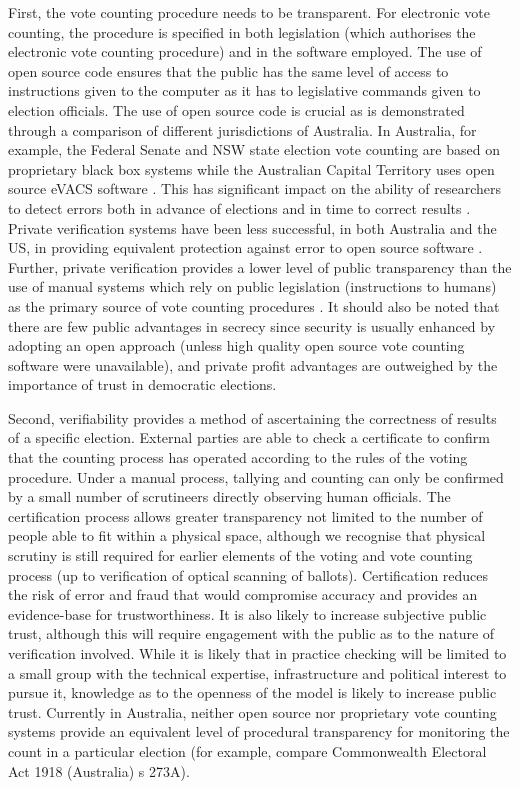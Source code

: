 First, the vote counting procedure needs to be transparent. For
electronic vote counting, the procedure is specified in both
legislation (which authorises the electronic vote counting
procedure) and in the software employed. The use of open source code
ensures that the public has the same level of access to instructions
given to the computer as it has to legislative commands given to
election officials. The use of open source code is crucial as is
demonstrated through a comparison of different jurisdictions of
Australia. In Australia, for example, the Federal Senate and NSW
state election vote counting are based on proprietary black box
systems while the Australian Capital Territory uses open source
eVACS software
\cite{AEC:2013:LMM,Conway:2017:ANS,EA:2016:EVC}. This has
significant impact on the ability of researchers to detect errors
both in advance of elections and in time to correct results
\cite{Conway:2017:ANS}.
Private verification systems have been less successful, in both
Australia and the US, in providing equivalent protection against
error to open source software
\cite{Carrier:2012:VCT,Conway:2017:ANS}. Further, private
verification provides a lower level of public transparency than the
use of manual systems which rely on public legislation (instructions
to humans) as the primary source of vote counting procedures
\cite{Carrier:2012:VCT}. It
should also be noted that there are few public advantages in secrecy
since security is usually enhanced by adopting an open approach
(unless high quality open source vote counting software were
unavailable), and private profit advantages are outweighed by the
importance of trust in democratic elections. 

Second, verifiability provides a method of ascertaining the
correctness of
results of a specific election. External parties are able to check a
certificate to confirm that the counting process has operated
according to the rules of the voting procedure.
Under a manual process, tallying and counting can only be confirmed by a small number of scrutineers directly observing human
officials. The certification process allows greater transparency not
limited to the number of people able to fit within a physical space,
although we recognise that physical scrutiny is still required for
earlier elements of the voting and vote counting process (up to
verification of optical scanning of ballots). Certification reduces
the risk of error and fraud that would compromise accuracy and
provides an evidence-base for trustworthiness. It is also likely to
increase subjective public trust, although this will require
engagement with the public as to the nature of verification
involved. While it is likely that in practice checking will be
limited to a small group with the technical expertise,
infrastructure and political interest to pursue it, knowledge as to
the openness of the model is likely to increase public trust.
Currently in Australia, neither open source nor proprietary vote
counting systems provide an equivalent level of procedural
transparency for monitoring the count in a particular election (for
example, compare Commonwealth Electoral Act 1918 (Australia) s
273A). 

